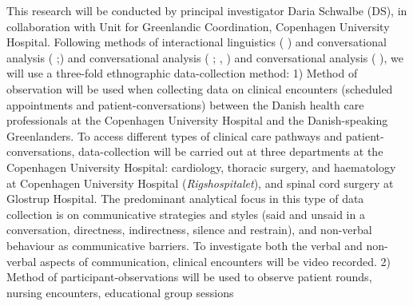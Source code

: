 \documentclass[twocolumn, issue, rga, authordate]{jote-new-article}
\begin{document}
This research will be conducted by principal investigator Daria Schwalbe
(DS), in collaboration with Unit for Greenlandic Coordination, Copenhagen University Hospital. Following methods of interactional linguistics ( \citeyear{Gumperz1972}) and conversational analysis ( \citeyear{Schegloff1990};\citeyear{Gumperz1972}) and conversational analysis ( \citeyear{Schegloff1991}; , \citeyear{Gumperz1972}) and conversational analysis ( \citeyear{Schegloff1991}), we will use a three-fold ethnographic data-collection method: 1)
Method of observation will be used when collecting data on clinical encounters (scheduled appointments and patient-conversations) between the Danish health care professionals at the Copenhagen University Hospital and the Danish-speaking Greenlanders. To access different types of clinical care pathways and patient-conversations, data-collection will be carried out at three departments at the Copenhagen University Hospital: cardiology, thoracic surgery, and haematology at Copenhagen University Hospital (\emph{Rigshospitalet}), and spinal cord surgery at Glostrup Hospital. The predominant analytical focus in this type of data collection is on communicative strategies and styles (said and unsaid in a conversation, directness, indirectness, silence and restrain), and non-verbal behaviour as communicative barriers. To investigate both the verbal and non-verbal aspects of communication, clinical encounters will be video recorded. 2) Method of participant-observations will be used to observe patient rounds, nursing encounters, educational group sessions
\end{document}
